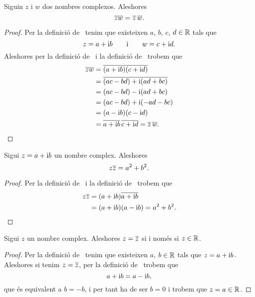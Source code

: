 \documentclass[../Apunts.tex]{subfiles}
\begin{document}
	\begin{proposition}
		\label{prop:el conjugat del producte és el producte de conjugats}
		Siguin \(z\) i \(w\) dos nombres complexos. Aleshores
		\[\overline{zw}=\overline{z}\,\overline{w}.\]
	\end{proposition}
	\begin{proof}
		Per la definició de~ tenim que existeixen \(a\), \(b\), \(c\), \(d\in\mathbb{R}\) tals que
		\[z=a+\mathrm{i} b\qquad\text{i}\qquad w=c+\mathrm{i} d.\]
		Aleshores per la definició de~ i la definició de~ trobem que
		\begin{align*}
			\overline{zw}&=\overline{(a+\mathrm{i} b)(c+\mathrm{i} d)} \\
			&=\overline{(ac-bd)+\mathrm{i}(ad+bc)} \\
			&=(ac-bd)-\mathrm{i}(ad+bc) \\
			&=(ac-bd)+\mathrm{i}(-ad-bc) \\
			&=(a-\mathrm{i} b)(c-\mathrm{i} d) \\
			&=\overline{a+\mathrm{i} b}\,\overline{c+\mathrm{i} d}=\overline{z}\,\overline{w}\qedhere.
		\end{align*}
	\end{proof}
	\begin{proposition}
		\label{prop:el producte d'un nombre complex pel seu conjugat és la suma dels quadrats de la seva part real i imaginaria}
		Sigui \(z=a+\mathrm{i} b\) un nombre complex. Aleshores
		\[z\overline{z}=a^{2}+b^{2}.\]
	\end{proposition}
	\begin{proof}
		Per la definició de~ i la definició de~ trobem que
		\begin{align*}
			z\overline{z}&=(a+\mathrm{i} b)\overline{a+\mathrm{i} b} \\
			&=(a+\mathrm{i} b)(a-\mathrm{i} b)=a^{2}+b^{2}.\qedhere
		\end{align*}
	\end{proof}
	\begin{proposition}
		\label{prop:un nombre complex és igual al seu conjugat si i només si és un real}
		Sigui \(z\) un nombre complex. Aleshores \(z=\overline{z}\) si i només si \(z\in\mathbb{R}\).
	\end{proposition}
	\begin{proof}
		Per la definició de~ tenim que existeixen \(a\), \(b\in\mathbb{R}\) tals que \(z=a+\mathrm{i} b\). Aleshores si tenim \(z=\overline{z}\), per la definició de~ trobem que
		\[a+\mathrm{i} b=a-\mathrm{i} b,\]
		que és equivalent a \(b=-b\), i per tant ha de ser \(b=0\) i trobem que \(z=a\in\mathbb{R}\).
	\end{proof}
\end{document}
